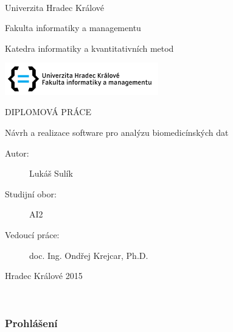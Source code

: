 \cleardoublepage{}~\thispagestyle{empty}\begin{center}
	
	\textsf{\Large Univerzita Hradec Králové}
	
	\vspace{0.5em}
	\textsf{\Large Fakulta informatiky a managementu}
	
	\vspace*{1em}
	\textsf{\Large Katedra informatiky a kvantitativních metod }
	
	\vspace{15mm}
	\includegraphics[width=0.5\textwidth]{images/uhk}
	
	\vspace{10mm}
	\textsf{\LARGE DIPLOMOVÁ PRÁCE}
	
	\vspace{10mm}
	\textsf{\LARGE Návrh a realizace software pro analýzu biomedicínských dat}
	
	\vspace{10mm}
\end{center} 

\vspace{10mm}
\begin{description}
	\item [{{\large Autor:}}] \noindent \textsf{\large Lukáš Sulík}
	\item [{{\large Studijní obor:}}] \noindent \textsf{\large AI2}
	\item [{{\large Vedoucí práce:}}] \noindent \textsf{\large doc. Ing. Ondřej Krejcar, Ph.D.}
\end{description}
\vfill
\hspace{2.5em}\textsf{\large Hradec Králové} \hfill \textsf{\large 2015}
\clearpage{}


\newpage{}\thispagestyle{plain}

{\small \setcounter{page}{2} %
	\ }{\small \par}

\noindent {\small \vfill{}
	~}{\small \par}

\subsubsection*{Prohlášení}

